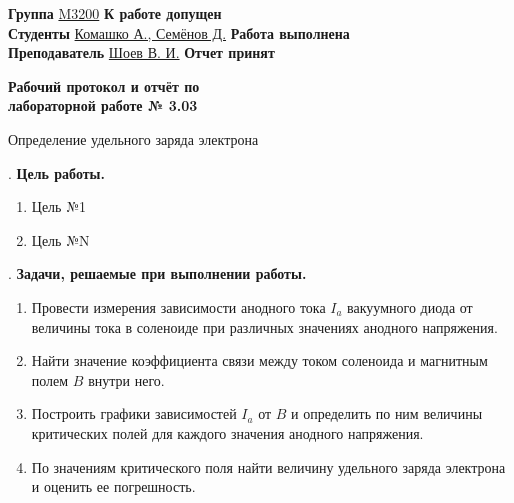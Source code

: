 \documentclass[12pt]{article}
\newcommand{\placeholder}[1]{{\color{magenta}#1}}
\begin{document}
    \vspace*{2\baselineskip}

    \thispagestyle{fancy}

    \noindent
    \textbf{Группа} \underline{M3200\hspace{4.5cm}} \hfill \textbf{К работе допущен} \underline{\hspace{4cm}} \\[0.5cm]
    \textbf{Студенты} \underline{Комашко А., Семёнов Д.\hspace{0.45cm}} \hfill \textbf{Работа выполнена} \underline{\hspace{4cm}} \\[0.5cm]
    \textbf{Преподаватель} \underline{Шоев В. И.\hspace{1.9cm}} \hfill \textbf{Отчет принят} \underline{\hspace{4.85cm}} \\



    \begin{center}
    {\huge \textbf{Рабочий протокол и отчёт по\\ лабораторной работе № 3.03}}

        \smallvspace

        {\Large Определение удельного заряда электрона}
    \end{center}


    . \textbf{Цель работы.}

    \begin{enumerate}
        \item \placeholder{Цель №1}

        \item \placeholder{Цель №N}
    \end{enumerate}

    \mediumvspace

    . \textbf{Задачи, решаемые при выполнении работы.}

    \begin{enumerate} 
        \item Провести измерения зависимости анодного тока $I_a$ вакуумного
        диода от величины тока в соленоиде при различных значениях
        анодного напряжения.
        \item Найти значение коэффициента связи между током соленоида
        и магнитным полем $B$ внутри него.
        \item Построить графики зависимостей $I_a$ от $B$ и определить по
        ним величины критических полей для каждого значения анодного
        напряжения.
        \item По значениям критического поля найти величину удельного
        заряда электрона и оценить ее погрешность.
    \end{enumerate}
\end{document}
